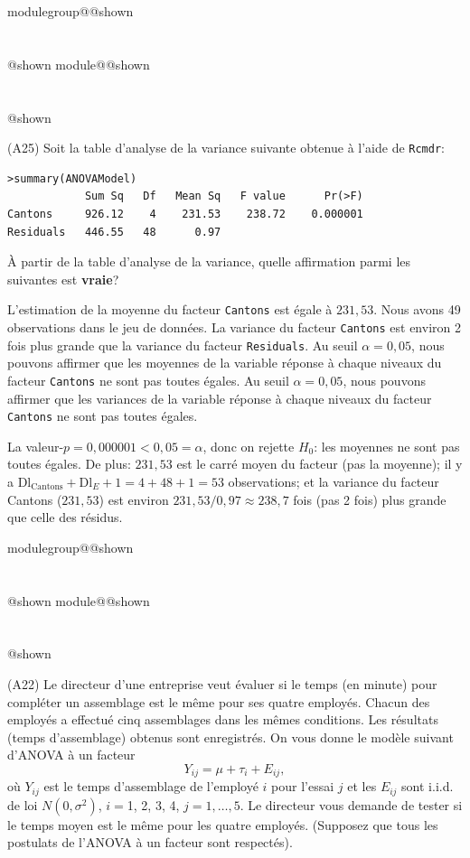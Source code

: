 \documentclass{Evaluation}
\makeatletter
\newcommand{\currentmodulekey}{}
\newcommand{\currentmoduletitle}{}
\newcommand{\currentgroupkey}{}
\newcommand{\currentgrouptitle}{}
\newcommand{\showmoduleifneeded}{%
  \ifx\currentgroupkey\empty\else
    \expandafter\ifx\csname modulegroup@\currentgroupkey @shown\endcsname\relax
      \section*{\currentgrouptitle}%
      \expandafter\gdef\csname modulegroup@\currentgroupkey @shown\endcsname{1}%
    \fi
  \fi
  \expandafter\ifx\csname module@\currentmodulekey @shown\endcsname\relax
    \section*{\currentmoduletitle}%
    \expandafter\gdef\csname module@\currentmodulekey @shown\endcsname{1}%
  \fi
}
\newenvironment{A22}{\showmoduleifneeded}{}
\newenvironment{A25}{\showmoduleifneeded}{}
\makeatother
\begin{document}
\begin{questions}
\begin{A25}
\question (A25) Soit la table d'analyse de la variance suivante obtenue à l'aide de \texttt{Rcmdr}:
\begin{verbatim}
>summary(ANOVAModel)
            Sum Sq   Df   Mean Sq   F value      Pr(>F)    
Cantons     926.12    4    231.53    238.72    0.000001 
Residuals   446.55   48      0.97
\end{verbatim}

À partir de la table d'analyse de la variance, quelle affirmation parmi les suivantes est \textbf{vraie}?



\begin{checkboxes}
\choice L'estimation de la moyenne du facteur \texttt{Cantons} est égale à $231,53$. 
\choice Nous avons 49 observations dans le jeu de données.
\choice La variance du facteur \texttt{Cantons} est environ 2 fois plus grande que la variance du facteur \texttt{Residuals}.
\correctchoice Au seuil $\alpha=0,05$, nous pouvons affirmer que les moyennes de la variable réponse à chaque niveaux du facteur \texttt{Cantons} ne sont pas toutes égales.
\choice Au seuil $\alpha=0,05$, nous pouvons affirmer que les variances de la variable réponse à chaque niveaux du facteur \texttt{Cantons} ne sont pas toutes égales.
\end{checkboxes}

\begin{solution}
La valeur-$p = 0{,}000001 < 0{,}05 = \alpha$, donc on rejette $H_0$: les moyennes ne sont pas toutes égales. De plus: $231{,}53$ est le carré moyen du facteur (pas la moyenne); il y a $\text{Dl}_{\text{Cantons}}+\text{Dl}_E+1 = 4+48+1 = 53$ observations; et la variance du facteur Cantons ($231{,}53$) est environ $231{,}53/0{,}97 \approx 238{,}7$ fois (pas 2 fois) plus grande que celle des résidus.
\end{solution}
\end{A25}



\begin{A22}
\question
(A22) 
Le directeur d'une entreprise veut évaluer si le temps (en minute) pour compléter un assemblage est le même pour ses quatre employés. Chacun des employés a effectué cinq assemblages dans les mêmes conditions. Les résultats (temps d'assemblage) obtenus sont enregistrés. 
On vous donne le modèle suivant d'ANOVA à un facteur
$$Y_{ij}=\mu+\tau_i+E_{ij},$$
où $Y_{ij}$ est le temps d'assemblage de l'employé $i$ pour l'essai $j$ et
les $E_{ij}$ sont i.i.d. de loi $N(0,\sigma^2)$, $i=$1, 2, 3, 4,
$j=1,\ldots,5$. 
Le directeur vous demande de tester si le temps moyen est le même pour les quatre employés.
(Supposez que tous les postulats de l'ANOVA à un facteur sont respectés).\medskip


\end{A22}
\end{questions}
\end{document}
